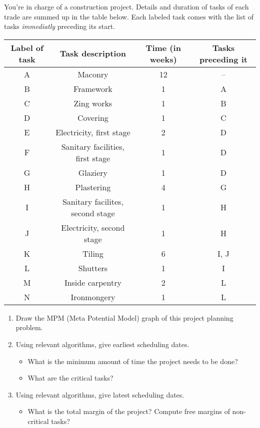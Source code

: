 \documentclass[12pt,a4paper]{article}
\begin{document}
\begin{question}
  You're in charge of a construction project. Details and duration of
  tasks of each trade are summed up in the table below. Each labeled
  task comes with the list of tasks \emph{immediatly} preceding its
  start.
    \vspace{2\baselineskip}
  \begin{center}
    \renewcommand{\arraystretch}{1.5}
    \begin{tabular}{|c|c|c|c|}
      \hline
      Label of task & Task description & Time (in weeks)  & Tasks preceding it \\
      \hline
      A  & Maconry & 12 & --   \\
      \hline
      B  & Framework & 1 & A  \\
      \hline
      C  & Zing works & 1 & B  \\
      \hline
      D  & Covering & 1 & C  \\
      \hline
      E  & Electricity, first stage & 2 & D  \\
      \hline
      F  & Sanitary facilities, first stage & 1 & D  \\
      \hline
      G  & Glaziery & 1 & D  \\
      \hline
      H  & Plastering & 4 & G  \\
      \hline
      I  & Sanitary facilites, second stage & 1 & H  \\
      \hline
      J  & Electricity, second stage & 1 & H  \\
      \hline
      K  & Tiling & 6 & I, J  \\
      \hline
      L  & Shutters & 1 & I  \\
      \hline
      M  & Inside carpentry & 2 &  L \\
      \hline
      N  & Ironmongery & 1 & L  \\
      \hline
    \end{tabular}
  \end{center}
  \vspace{\baselineskip}
  \begin{enumerate}
  \item Draw the MPM (Meta Potential Model) graph of this project
    planning problem.
  \item Using relevant algorithms, give earliest scheduling dates.
    \begin{itemize}
    \item What is the minimum amount of time the project needs to be done?
    \item What are the critical tasks?
    \end{itemize}
  \item Using relevant algorithms, give latest scheduling dates.
    \begin{itemize}
    \item What is the total margin of the project? Compute free
      margins of non-critical tasks?
    \end{itemize}
  \end{enumerate}
\end{question}
\end{document}
